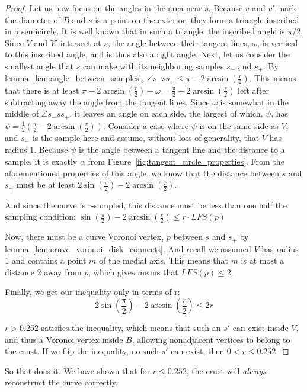 \begin{proof}
	Let us now focus on the angles in the area near $s$.
	Because $v$ and $v'$ mark the diameter of $B$ and $s$ is a point on the exterior, they form a triangle inscribed in a semicircle.
	It is well known that in such a triangle, the inscribed angle is $\pi/2$.
	Since $V$ and $V'$ intersect at $s$, the angle between their tangent lines, $\omega$, is vertical to this inscribed angle, and is thus also a right angle.
	Next, let us consider the smallest angle that $s$ can make with its neighboring samples $s_-$ and $s_+$.
	By lemma~\ref{lem:angle_between_samples}, $\angle s_-ss_+ \le \pi - 2\arcsin(\frac{r}{2})$.
	This means that there is at least $\pi - 2\arcsin(\frac{r}{2}) - \omega = \frac{\pi}{2} - 2\arcsin(\frac{r}{2})$ left after subtracting away the angle from the tangent lines.
	Since $\omega$ is somewhat in the middle of $\angle s_-ss_+$, it leaves an angle on each side, the largest of which, $\psi$, has $\psi = \frac{1}{2}(\frac{\pi}{2} - 2\arcsin(\frac{r}{2}))$.
	Consider a case where $\psi$ is on the same side as $V$, and $s_+$ is the sample here and assume, without loss of generality, that $V$ has radius 1.
	Because $\psi$ is the angle between a tangent line and the distance to a sample, it is exactly $\alpha$ from Figure~\ref{fig:tangent_circle_properties}.
	From the aforementioned properties of this angle, we know that the distance between $s$ and $s_+$ must be at least $2\sin(\frac{\pi}{2}) - 2\arcsin(\frac{r}{2})$.

	And since the curve is r-sampled, this distance must be less than one half the sampling condition: $\sin(\frac{\pi}{2}) - 2\arcsin(\frac{r}{2}) \le r\cdot LFS(p)$

	Now, there must be a curve Voronoi vertex, $p$ between $s$ and $s_+$ by lemma~\ref{lem:cruve_voronoi_disk_connects}.
	And recall we assumed $V$ has radius 1 and contains a point $m$ of the medial axis.
	This means that $m$ is at most a distance 2 away from $p$, which gives means that $LFS(p) \le 2$.

	Finally, we get our inequality only in terms of r:
	\[
		2\sin(\frac{\pi}{2}) - 2\arcsin(\frac{r}{2}) \le 2r
	\]

	$r > 0.252$ satisfies the inequality, which means that such an $s'$ can exist inside $V$, and thus a Voronoi vertex inside $B$, allowing nonadjacent vertices to belong to the crust.
	If we flip the inequality, no such $s'$ can exist, then $0 < r \le 0.252$.

\end{proof}

So that does it.
We have shown that for $r \le 0.252$, the crust will \textit{always} reconstruct the curve correctly.






